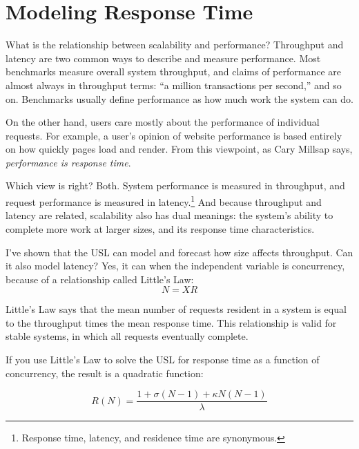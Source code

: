 \documentclass{vivid_layout}
\begin{document}
\section{Modeling Response Time}

What is the relationship between scalability and performance?  Throughput and
latency are two common ways to describe and measure performance. Most benchmarks
measure overall system throughput, and claims of performance are almost always
in throughput terms: ``a million transactions per second,'' and so on.
Benchmarks usually define performance as how much work the system can do.

On the other hand, users care mostly about the performance of individual
requests. For example, a user's opinion of website performance is based entirely on
how quickly pages load and render.  From this viewpoint, as Cary Millsap says,
{\itshape performance is response time}.

Which view is right? Both. System performance is measured in throughput, and
request performance is measured in latency.\footnote{Response time, latency, and
residence time are synonymous.} And because throughput and latency
are related, scalability also has dual meanings: the system's ability to
complete more work at larger sizes, and its response time characteristics.

I've shown that the USL can model and forecast how size affects throughput. Can
it also model latency? Yes, it can when the independent variable is concurrency,
because of a relationship called Little's Law:
\begin{equation}
N = X R
\label{littles_law}
\end{equation}

Little's Law says that the mean number of requests resident in a system is
equal to the throughput times the mean response time. This relationship is
valid for stable systems, in which all requests eventually complete.

If you use Little's Law to solve the USL for response time as a function of
concurrency, the result is a quadratic function:

\begin{equation}
R(N)=\frac{1+\sigma(N-1)+\kappa N(N-1)}{\lambda}
\label{r_n}
\end{equation}
\end{document}
